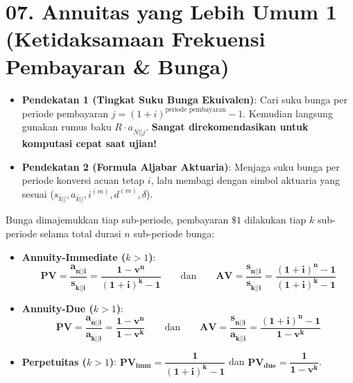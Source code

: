 \documentclass[10pt,a4paper]{article}
\newcommand{\angl}[1]{\overline{#1|}}
\begin{document}
\section*{\large 07. Annuitas yang Lebih Umum 1 (Ketidaksamaan Frekuensi Pembayaran \& Bunga)}

\begin{teoremabox}
\begin{itemize}[leftmargin=1.5em, topsep=1.5pt, itemsep=2pt]
    \item \textbf{Pendekatan 1 (Tingkat Suku Bunga Ekuivalen)}: Cari suku bunga per periode pembayaran $j = (1+i)^{\text{periode pembayaran}} - 1$. Kemudian langsung gunakan rumus baku $R \cdot a_{\angl{N}|j}$. \textbf{Sangat direkomendasikan untuk komputasi cepat saat ujian!}
    \item \textbf{Pendekatan 2 (Formula Aljabar Aktuaria)}: Menjaga suku bunga per periode konversi acuan tetap $i$, lalu membagi dengan simbol aktuaria yang sesuai ($s_{\angl{k}|}, a_{\angl{k}|}, i^{(m)}, d^{(m)}, \delta$).
\end{itemize}
\end{teoremabox}

\begin{rumusbox}
Bunga dimajemukkan tiap sub-periode, pembayaran $\$1$ dilakukan tiap $k$ sub-periode selama total durasi $n$ sub-periode bunga:
\begin{itemize}[leftmargin=1.5em, topsep=1.5pt, itemsep=2pt]
    \item \textbf{Annuity-Immediate ($k > 1$)}:
    \begin{equation*}
        \mathbf{PV = \frac{a_{\angl{n}|i}}{s_{\angl{k}|i}} = \frac{1 - v^n}{(1+i)^k - 1}} \qquad\text{dan}\qquad \mathbf{AV = \frac{s_{\angl{n}|i}}{s_{\angl{k}|i}} = \frac{(1+i)^n - 1}{(1+i)^k - 1}}
    \end{equation*}
    \item \textbf{Annuity-Due ($k > 1$)}:
    \begin{equation*}
        \mathbf{PV = \frac{a_{\angl{n}|i}}{a_{\angl{k}|i}} = \frac{1 - v^n}{1 - v^k}} \qquad\text{dan}\qquad \mathbf{AV = \frac{s_{\angl{n}|i}}{a_{\angl{k}|i}} = \frac{(1+i)^n - 1}{1 - v^k}}
    \end{equation*}
    \item \textbf{Perpetuitas ($k > 1$)}: $\mathbf{PV_{\text{imm}} = \dfrac{1}{(1+i)^k - 1}}$ \qquad dan \qquad $\mathbf{PV_{\text{due}} = \dfrac{1}{1 - v^k}}$.
\end{itemize}
\end{rumusbox}
\end{document}
